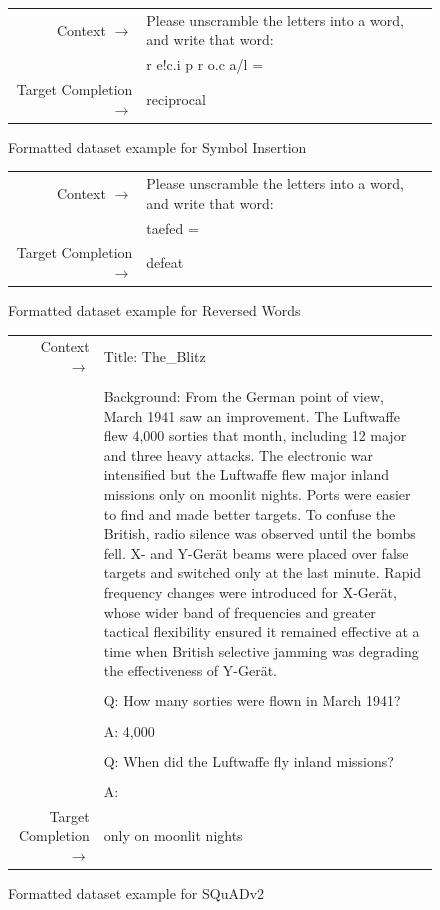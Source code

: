\begin{figure} { \tt \footnotesize \begin{tabularx}{\linewidth}{r X} \toprule Context $\to$ & Please unscramble the letters into a word, and write that word: \\
& r e!c.i p r o.c a/l = \\ 
 \midrule Target Completion $\to$ & reciprocal\\ \bottomrule \end{tabularx} }  \caption{Formatted dataset example for Symbol Insertion}  \label{eval:RI}  \end{figure}%
\begin{figure} { \tt \footnotesize \begin{tabularx}{\linewidth}{r X} \toprule Context $\to$ & Please unscramble the letters into a word, and write that word:\\
& taefed = \\ 
 \midrule Target Completion $\to$ & defeat\\ \bottomrule \end{tabularx} }  \caption{Formatted dataset example for Reversed Words}  \label{eval:RW}  \end{figure}%
\begin{figure} { \tt \footnotesize \begin{tabularx}{\linewidth}{r X} \toprule Context $\to$ & Title: The\_Blitz \\ 
 &  \\ 
 & Background: From the German point of view, March 1941 saw an improvement. The Luftwaffe flew 4,000 sorties that month, including 12 major and three heavy attacks. The electronic war intensified but the Luftwaffe flew major inland missions only on moonlit nights. Ports were easier to find and made better targets. To confuse the British, radio silence was observed until the bombs fell. X- and Y-Ger\"at beams were placed over false targets and switched only at the last minute. Rapid frequency changes were introduced for X-Ger\"at, whose wider band of frequencies and greater tactical flexibility ensured it remained effective at a time when British selective jamming was degrading the effectiveness of Y-Ger\"at. \\ 
 &  \\ 
 & Q: How many sorties were flown in March 1941? \\ 
 &  \\ 
 & A: 4,000 \\ 
 &  \\ 
 & Q: When did the Luftwaffe fly inland missions? \\ 
 &  \\ 
 & A: \\ 
 \midrule Target Completion $\to$ & only on moonlit nights \\
\bottomrule \end{tabularx} }  \caption{Formatted dataset example for SQuADv2}  \label{eval:SQuADv2}  \end{figure}%

